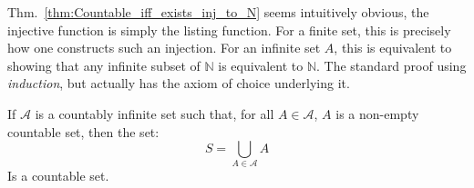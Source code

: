             Thm.~\ref{thm:Countable_iff_exists_inj_to_N} seems
            intuitively obvious, the injective function is
            simply the listing function. For a finite set, this
            is precisely how one constructs such an injection.
            For an infinite set $A$, this is equivalent to
            showing that any infinite subset of $\mathbb{N}$ is
            equivalent to $\mathbb{N}$. The standard proof
            using \textit{induction}, but actually has the axiom
            of choice underlying it.
            \begin{theorem}
                If $\mathcal{A}$ is a countably infinite set
                such that, for all $A\in\mathcal{A}$, $A$ is
                a non-empty countable set, then the set:
                \begin{equation}
                    S=\bigcup_{A\in\mathcal{A}}A
                \end{equation}
                Is a countable set.
            \end{theorem}
